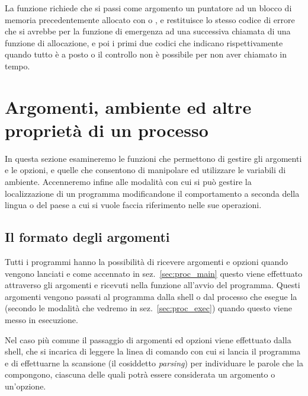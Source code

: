 La funzione richiede che si passi come argomento un puntatore ad un blocco di
memoria precedentemente allocato con  o , e
restituisce lo stesso codice di errore che si avrebbe per la funzione di
emergenza ad una successiva chiamata di una funzione di allocazione, e poi i
primi due codici che indicano rispettivamente quando tutto è a posto o il
controllo non è possibile per non aver chiamato  in tempo.



\section{Argomenti, ambiente ed altre proprietà di un processo}
\label{sec:proc_options}

In questa sezione esamineremo le funzioni che permettono di gestire gli
argomenti e le opzioni, e quelle che consentono di manipolare ed utilizzare le
variabili di ambiente. Accenneremo infine alle modalità con cui si può gestire
la localizzazione di un programma modificandone il comportamento a seconda
della lingua o del paese a cui si vuole faccia riferimento nelle sue
operazioni. 

\subsection{Il formato degli argomenti}
\label{sec:proc_par_format}

Tutti i programmi hanno la possibilità di ricevere argomenti e opzioni quando
vengono lanciati e come accennato in sez.~\ref{sec:proc_main} questo viene
effettuato attraverso gli argomenti  e  ricevuti nella
funzione  all'avvio del programma. Questi argomenti vengono passati
al programma dalla shell o dal processo che esegue la  (secondo le
modalità che vedremo in sez.~\ref{sec:proc_exec}) quando questo viene messo in
esecuzione.

Nel caso più comune il passaggio di argomenti ed opzioni viene effettuato
dalla shell, che si incarica di leggere la linea di comando con cui si lancia
il programma e di effettuarne la scansione (il cosiddetto \textit{parsing})
per individuare le parole che la compongono, ciascuna delle quali potrà essere
considerata un argomento o un'opzione. 

